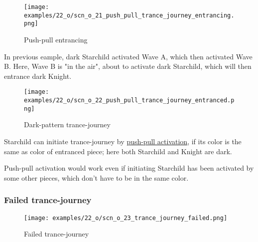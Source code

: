 \vspace*{3.9\baselineskip}
\noindent
\begin{wrapfigure}[10]{l}{0.4\textwidth}
\centering
\texttt{[image: examples/22\_o/scn\_o\_21\_push\_pull\_trance\_journey\_entrancing.png]}
\caption{Push-pull entrancing}
\label{fig:scn_o_21_push_pull_trance_journey_entrancing}
\end{wrapfigure}
In previous eample, dark Starchild activated Wave A, which then activated Wave B. Here, Wave B is
"in the air", about to activate dark Starchild, which will then entrance dark Knight.

\clearpage %

\noindent
\begin{figure}[!h]
\texttt{[image: examples/22\_o/scn\_o\_22\_push\_pull\_trance\_journey\_entranced.png]}
\caption{Dark-pattern trance-journey}
\label{fig:scn_o_22_push_pull_trance_journey_entranced}
\end{figure}

Starchild can initiate trance-journey by
\hyperref[sec:Terms/Push-pull activation]{push-pull activation},
if its color is the same as color of entranced piece; here both Starchild and Knight are dark.

Push-pull activation would work even if initiating Starchild has been activated by some other pieces,
which don't have to be in the same color.

\clearpage %

\subsubsection*{Failed trance-journey}

\vspace*{-1.1\baselineskip}
\noindent
\begin{figure}[!h]
\texttt{[image: examples/22\_o/scn\_o\_23\_trance\_journey\_failed.png]}
\caption{Failed trance-journey}
\label{fig:scn_o_23_trance_journey_failed}
\end{figure}

